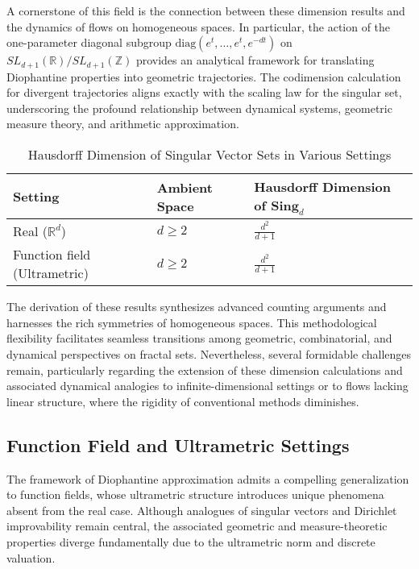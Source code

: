 \documentclass[sigconf]{acmart}
\begin{document}
A cornerstone of this field is the connection between these dimension results and the dynamics of flows on homogeneous spaces. In particular, the action of the one-parameter diagonal subgroup $\mathrm{diag}(e^t, \ldots, e^t, e^{-dt})$ on $SL_{d+1}(\mathbb{R})/SL_{d+1}(\mathbb{Z})$ provides an analytical framework for translating Diophantine properties into geometric trajectories. The codimension calculation for divergent trajectories aligns exactly with the scaling law for the singular set, underscoring the profound relationship between dynamical systems, geometric measure theory, and arithmetic approximation.

\begin{table*}[htbp]
\centering
\caption{Hausdorff Dimension of Singular Vector Sets in Various Settings}
\label{tab:dimension_comparison}
\begin{adjustbox}{max width=\textwidth}
\begin{tabular}{lll}
\toprule
\textbf{Setting} & \textbf{Ambient Space} & \textbf{Hausdorff Dimension of $\mathbf{Sing}_d$} \\
\midrule
Real ($\mathbb{R}^d$) & $d \geq 2$ & $\frac{d^2}{d+1}$ \\
Function field (Ultrametric) & $d \geq 2$ & $\frac{d^2}{d+1}$ \\
\bottomrule
\end{tabular}
\end{adjustbox}
\end{table*}

The derivation of these results synthesizes advanced counting arguments and harnesses the rich symmetries of homogeneous spaces. This methodological flexibility facilitates seamless transitions among geometric, combinatorial, and dynamical perspectives on fractal sets. Nevertheless, several formidable challenges remain, particularly regarding the extension of these dimension calculations and associated dynamical analogies to infinite-dimensional settings or to flows lacking linear structure, where the rigidity of conventional methods diminishes.

\subsection{Function Field and Ultrametric Settings}

The framework of Diophantine approximation admits a compelling generalization to function fields, whose ultrametric structure introduces unique phenomena absent from the real case. Although analogues of singular vectors and Dirichlet improvability remain central, the associated geometric and measure-theoretic properties diverge fundamentally due to the ultrametric norm and discrete valuation.
\end{document}
